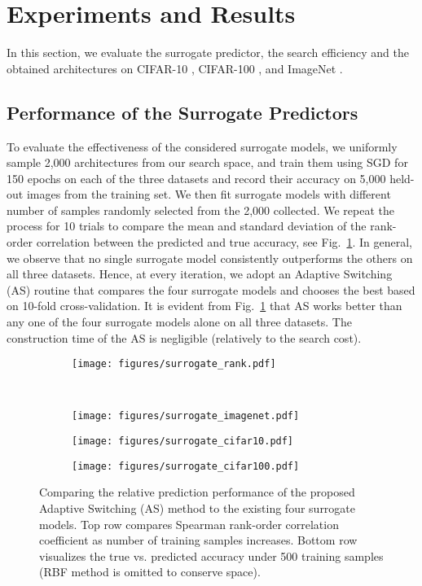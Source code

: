 \documentclass[runningheads]{llncs}
\begin{document}
 \section{Experiments and Results}
In this section, we evaluate the surrogate predictor, the search efficiency and the obtained architectures on CIFAR-10 \cite{cifar}, CIFAR-100 \cite{cifar}, and ImageNet \cite{imagenet}.

\subsection{Performance of the Surrogate Predictors\label{subsec:surrogate}}
To evaluate the effectiveness of the considered surrogate models, we uniformly sample 2,000 architectures from our search space, and train them using SGD for 150 epochs on each of the three datasets and record their accuracy on 5,000 held-out images from the training set. We then fit surrogate models with different number of samples randomly selected from the 2,000 collected. We repeat the process for 10 trials to compare the mean and standard deviation of the rank-order correlation between the predicted and true accuracy, see Fig.~\ref{fig:surrogate}. In general, we observe that no single surrogate model consistently outperforms the others on all three datasets. Hence, at every iteration, we adopt an Adaptive Switching (AS) routine that compares the four surrogate models and chooses the best based on 10-fold cross-validation. It is evident from Fig.~\ref{fig:surrogate} that AS works better than any one of the four surrogate models alone on all three datasets. The construction time of the AS is negligible (relatively to the search cost).

\begin{figure}[t]
    \begin{subfigure}[b]{0.98\textwidth}
    \centering
    \texttt{[image: figures/surrogate\_rank.pdf]}
    \end{subfigure}\\
    \begin{subfigure}[b]{0.32\textwidth}
    \texttt{[image: figures/surrogate\_imagenet.pdf]}
    \end{subfigure}
    \begin{subfigure}[b]{0.32\textwidth}
    \texttt{[image: figures/surrogate\_cifar10.pdf]}
    \end{subfigure}
    \begin{subfigure}[b]{0.32\textwidth}
    \texttt{[image: figures/surrogate\_cifar100.pdf]}
    \end{subfigure}
    \caption{Comparing the relative prediction performance of the proposed Adaptive Switching (AS) method to the existing four surrogate models. Top row compares Spearman rank-order correlation coefficient as number of training samples increases. Bottom row visualizes the true vs. predicted accuracy under 500 training samples (RBF method is omitted to conserve space).
    \label{fig:surrogate}}
\end{figure}
\end{document}
